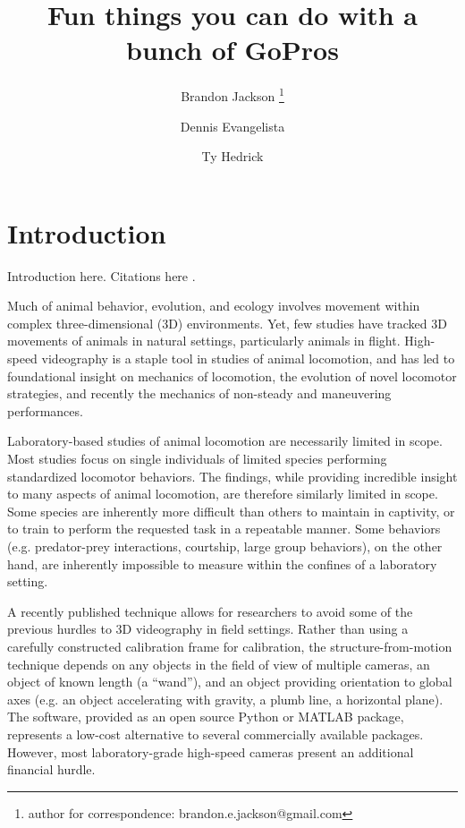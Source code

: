 \documentclass[fleqn,10pt]{wlpeerj}
\title{Fun things you can do with a bunch of GoPros}
\author[1,2]{Brandon Jackson \thanks{author for correspondence: brandon.e.jackson@gmail.com}}
\author[2]{Dennis Evangelista}
\author[2]{Ty Hedrick}
\affil[1]{Longwood College, Charlottesville, VA}
\affil[2]{University of North Carolina at Chapel Hill, NC 27599-3280, USA}
\begin{document}
\flushbottom
\maketitle
\thispagestyle{empty}

\modulolinenumbers[5]
\linenumbers

\section*{Introduction}

Introduction here. Citations here \citep{Theriault:2014, Bradski:2008}. 

Much of animal behavior, evolution, and ecology involves movement within complex three-dimensional (3D) environments.  Yet, few studies have tracked 3D movements of animals in natural settings, particularly animals in flight.  High-speed videography is a staple tool in studies of animal locomotion, and has led to foundational insight on mechanics of locomotion, the evolution of novel locomotor strategies, and recently the mechanics of non-steady and maneuvering performances.  

Laboratory-based studies of animal locomotion are necessarily limited in scope.  Most studies focus on single individuals of limited species performing standardized locomotor behaviors.  The findings, while providing incredible insight to many aspects of animal locomotion, are therefore similarly limited in scope.  Some species are inherently more difficult than others to maintain in captivity, or to train to perform the requested task in a repeatable manner.  Some behaviors (e.g. predator-prey interactions, courtship, large group behaviors), on the other hand, are inherently impossible to measure within the confines of a laboratory setting.  

A recently published technique allows for researchers to avoid some of the previous hurdles to 3D videography in field settings.  Rather than using a carefully constructed calibration frame for calibration, the structure-from-motion technique depends on any objects in the field of view of multiple cameras, an object of known length (a “wand”), and an object providing orientation to global axes (e.g. an object accelerating with gravity, a plumb line, a horizontal plane).  The software, provided as an open source Python or MATLAB package, represents a low-cost alternative to several commercially available packages.  However, most laboratory-grade high-speed cameras present an additional financial hurdle.
\end{document}
